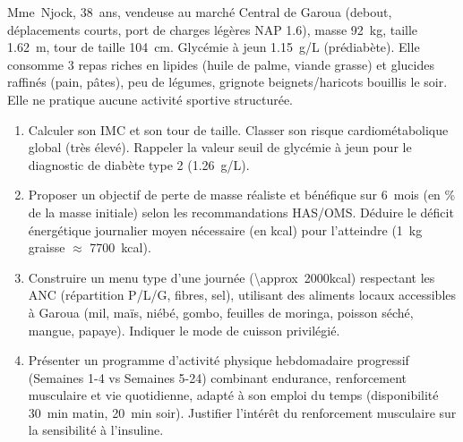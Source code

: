 \documentclass[11pt]{article}
\begin{document}
\begin{exercice}
Mme~Njock, 38~ans, vendeuse au marché Central de Garoua (debout, déplacements courts, port de charges légères \approx NAP \SI{1,6}{}), masse \SI{92}{kg}, taille \SI{1,62}{m}, tour de taille \SI{104}{cm}. Glycémie à jeun \SI{1,15}{g/L} (prédiabète). Elle consomme 3 repas riches en lipides (huile de palme, viande grasse) et glucides raffinés (pain, pâtes), peu de légumes, grignote beignets/haricots bouillis le soir. Elle ne pratique aucune activité sportive structurée.
\begin{enumerate}
    \item Calculer son IMC et son tour de taille. Classer son risque cardiométabolique global (très élevé). Rappeler la valeur seuil de glycémie à jeun pour le diagnostic de diabète type 2 (\SI{1,26}{g/L}).
    \item Proposer un objectif de perte de masse réaliste et bénéfique sur 6~mois (en \% de la masse initiale) selon les recommandations HAS/OMS. Déduire le déficit énergétique journalier moyen nécessaire (en kcal) pour l'atteindre (\SI{1}{kg} graisse $\approx$ \SI{7700}{kcal}).
    \item Construire un menu type d'une journée (\SI{\approx}{2000}{kcal}) respectant les ANC (répartition P/L/G, fibres, sel), utilisant des aliments locaux accessibles à Garoua (mil, maïs, niébé, gombo, feuilles de moringa, poisson séché, mangue, papaye). Indiquer le mode de cuisson privilégié.
    \item Présenter un programme d'activité physique hebdomadaire progressif (Semaines 1-4 vs Semaines 5-24) combinant endurance, renforcement musculaire et vie quotidienne, adapté à son emploi du temps (disponibilité \SI{30}{min} matin, \SI{20}{min} soir). Justifier l'intérêt du renforcement musculaire sur la sensibilité à l'insuline.
\end{enumerate}
\end{exercice}
\end{document}
